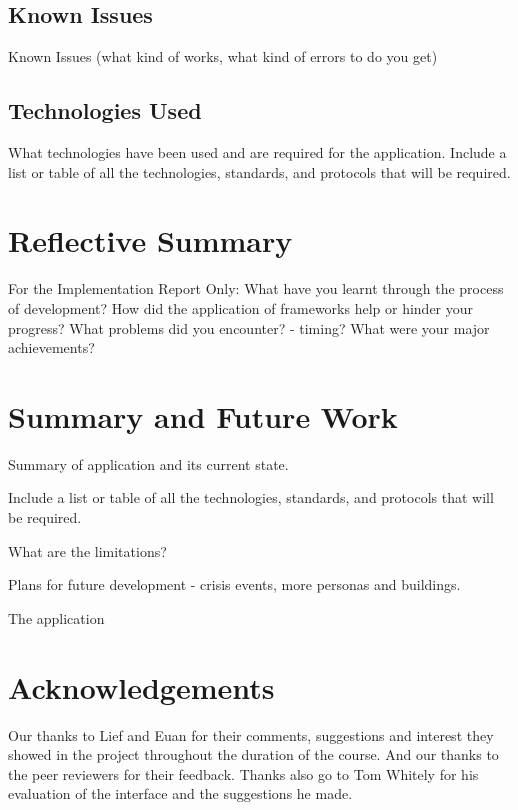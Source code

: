 \documentclass{sig-alt-release2}
\begin{document}
\subsection{Known Issues}

Known Issues (what kind of works, what kind of errors to do you get)

\subsection{Technologies Used}

What technologies have been used and are required for the application. Include a list or table of all the technologies, standards, and protocols that will be required.

\section{Reflective Summary}

For the Implementation Report Only:
What have you learnt through the process of development? 
How did the application of frameworks help or hinder your progress?
What problems did you encounter? - timing?
What were your major achievements?


\section{Summary and Future Work}

Summary of application and its current state.

Include a list or table of all the technologies, standards, and protocols that will be required.

What are the limitations?

Plans for future development - crisis events, more personas and buildings.

The application 

\section{Acknowledgements}
Our thanks to Lief and Euan for their comments, suggestions and interest they showed in the project throughout the duration of the course. And our thanks to the peer reviewers for their feedback.
Thanks also go to Tom Whitely for his evaluation of the interface and the suggestions he made.



\end{document}
